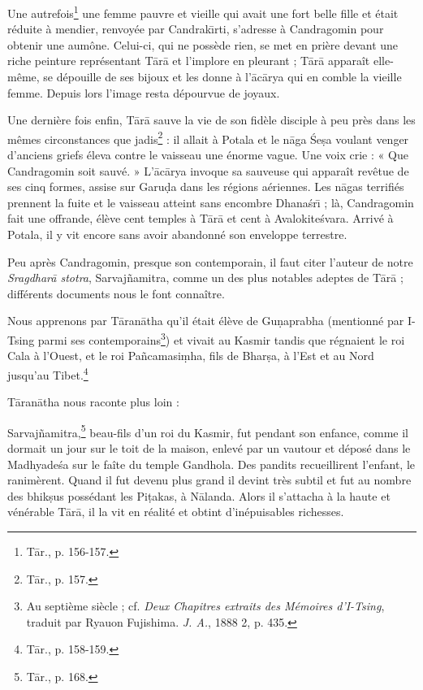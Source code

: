\documentclass[a4paper, 11pt, oneside, french, landscape, twocolumn]{article}
\begin{document}
Une autrefois\footnote{T\={a}r., p. 156-157.} une femme pauvre et vieille qui avait une fort belle fille et était réduite à mendier, renvoyée par Candrak\={\i}rti, s'adresse à Candragomin pour obtenir une aumône. Celui-ci, qui ne possède rien, se met en prière devant une riche peinture représentant T\={a}r\={a} et l'implore en pleurant ; T\={a}r\={a} apparaît elle-même, se dépouille de ses bijoux et les donne à l'\={a}c\={a}rya qui en comble la vieille femme. Depuis lors l'image resta dépourvue de joyaux.

Une dernière fois enfin, T\={a}r\={a} sauve la vie de son fidèle disciple à peu près dans les mêmes circonstances que jadis\footnote{T\={a}r., p. 157.} : il allait à Potala et le n\={a}ga \'{S}e\d{s}a voulant venger d'anciens griefs éleva contre le vaisseau une énorme vague. Une voix crie : « Que Candragomin soit sauvé. » L'\={a}c\={a}rya invoque sa sauveuse qui apparaît revêtue de ses cinq formes, assise sur Garu\d{d}a dans les régions aériennes. Les n\={a}gas terrifiés prennent la fuite et le vaisseau atteint sans encombre Dhana\'{s}r\={\i} ; là, Candragomin fait une offrande, élève cent temples à T\={a}r\={a} et cent à Avalokite\'{s}vara. Arrivé à Potala, il y vit encore sans avoir abandonné son enveloppe terrestre.

Peu après Candragomin, presque son contemporain, il faut citer l'auteur de notre \emph{Sragdhar\={a} stotra}, Sarvaj\~{n}amitra, comme un des plus notables adeptes de T\={a}r\={a} ; différents documents nous le font connaître.

Nous apprenons par T\={a}ran\={a}tha qu'il était élève de Gu\d{n}aprabha (mentionné par I-Tsing parmi ses contemporains\footnote{Au septième siècle ; cf. \emph{Deux Chapitres extraits des Mémoires d'I-Tsing}, traduit par Ryauon Fujishima. \emph{J. A.}, 1888 2, p. 435.}) et vivait au Kasmir tandis que régnaient le roi Cala à l'Ouest, et le roi Pa\~{n}camasi\d{m}ha, fils de Bhar\d{s}a, à l'Est et au Nord jusqu'au Tibet.\footnote{T\={a}r., p. 158-159.}

T\={a}ran\={a}tha nous raconte plus loin :

Sarvaj\~{n}amitra,\footnote{T\={a}r., p. 168.} beau-fils d'un roi du Kasmir, fut pendant son enfance, comme il dormait un jour sur le toit de la maison, enlevé par un vautour et déposé dans le Madhyade\'{s}a sur le faîte du temple Gandhola. Des pandits recueillirent l'enfant, le ranimèrent. Quand il fut devenu plus grand il devint très subtil et fut au nombre des bhik\d{s}us possédant les Pi\d{t}akas, à N\={a}landa. Alors il s'attacha à la haute et vénérable T\={a}r\={a}, il la vit en réalité et obtint d'inépuisables richesses.
\end{document}
